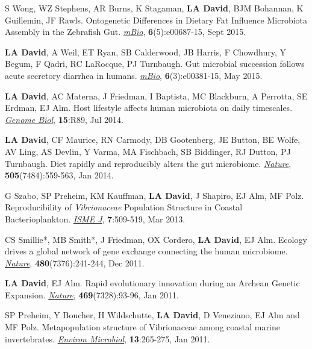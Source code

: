 \documentclass[overlapped,line,11pt]{res}
\begin{document}
\begin{resume}
\begin{revnumerate}[20]
\item {S Wong, WZ Stephens, AR Burns, K Stagaman, \textbf{LA David},
  BJM Bohannan, K Guillemin, JF Rawls.  Ontogenetic Differences in
  Dietary Fat Influence Microbiota Assembly in the Zebrafish Gut.
  \emph{\underline{mBio}}, \textbf{6}(5):e00687-15, Sept 2015.}

\item {\textbf{LA David}, A Weil, ET Ryan, SB Calderwood, JB Harris, F
  Chowdhury, Y Begum, F Qadri, RC LaRocque, PJ Turnbaugh.  Gut
  microbial succession follows acute secretory diarrhea in humans.
 \emph{\underline{mBio}}, \textbf{6}(3):e00381-15, May 2015.}

\item {\textbf{LA David}, AC Materna, J Friedman, I Baptista, MC
  Blackburn, A Perrotta, SE Erdman, EJ Alm.  Host lifestyle affects
  human microbiota on daily timescales.
  \emph{\underline{Genome Biol}}, \textbf{15}:R89, Jul 2014.}

\item {\textbf{LA David}, CF Maurice, RN Carmody, DB Gootenberg, JE
  Button, BE Wolfe, AV Ling, AS Devlin, Y Varma, MA Fischbach, SB
  Biddinger, RJ Dutton, PJ Turnbaugh.  Diet rapidly and reproducibly
  alters the gut microbiome. \emph{\underline{Nature}},
  \textbf{505}(7484):559-563, Jan 2014.}

\item {G Szabo, SP Preheim, KM Kauffman, \textbf{LA David}, J Shapiro,
  EJ Alm, MF Polz.  Reproducibility of \emph{Vibrionaceae} Population
  Structure in Coastal Bacterioplankton. \emph{\underline{ISME J}},
  \textbf{7}:509-519, Mar 2013.}

\item {CS Smillie*, MB Smith*, J Friedman, OX Cordero, \textbf{LA
    David}, EJ Alm.  Ecology drives a global network of gene exchange
  connecting the human microbiome. \emph{\underline{Nature}},
  \textbf{480}(7376):241-244, Dec 2011.}

\item {\textbf{LA David}, EJ Alm.  Rapid evolutionary innovation during
  an Archean Genetic Expansion.  \emph{\underline{Nature}},
  \textbf{469}(7328):93-96, Jan 2011.}

\vspace*{1mm}
\item {SP Preheim, Y Boucher, H Wildschutte, \textbf{LA David},
  D Veneziano, EJ Alm and MF Polz.  Metapopulation
  structure of Vibrionaceae among coastal marine
  invertebrates. \emph{\underline{Environ Microbiol}}, \textbf{13}:265-275, Jan 2011.} 


\end{revnumerate}
\end{resume}
\end{document}

